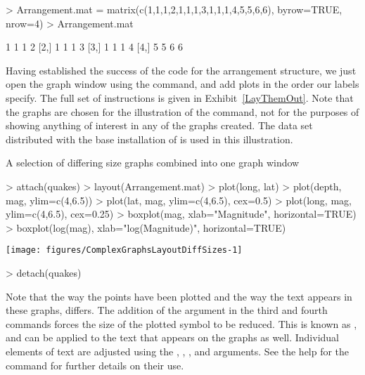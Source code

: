 \begin{Schunk}
\begin{Sinput}
> Arrangement.mat = matrix(c(1,1,1,2,1,1,1,3,1,1,1,4,5,5,6,6), byrow=TRUE, nrow=4) 
> Arrangement.mat 
\end{Sinput}
\begin{Soutput}
     [,1] [,2] [,3] [,4]
[1,]    1    1    1    2
[2,]    1    1    1    3
[3,]    1    1    1    4
[4,]    5    5    6    6
\end{Soutput}
\end{Schunk}

 
Having established the success of the code for the arrangement structure, we just open the graph window using the  command, and add plots in the order our labels specify. The full set of instructions is given in Exhibit~\ref{LayThemOut}. Note that the graphs are chosen for the illustration of the  command, not for the purposes of showing anything of interest in any of the graphs created. The  data set distributed with the base installation of \R{} is used in this illustration. 
\begin{exhibit} 
\begin{center} 
\caption{A selection of differing size graphs combined into one graph window} 
\label{LayThemOut} 

\begin{Schunk}
\begin{Sinput}
> attach(quakes) 
> layout(Arrangement.mat) 
> plot(long, lat) 
> plot(depth, mag, ylim=c(4,6.5)) 
> plot(lat, mag, ylim=c(4,6.5), cex=0.5) 
> plot(long, mag, ylim=c(4,6.5), cex=0.25) 
> boxplot(mag, xlab="Magnitude", horizontal=TRUE) 
> boxplot(log(mag), xlab="log(Magnitude)", horizontal=TRUE) 
\end{Sinput}

\texttt{[image: figures/ComplexGraphsLayoutDiffSizes-1]} \begin{Sinput}
> detach(quakes) 
\end{Sinput}
\end{Schunk}

\end{center} 
\end{exhibit} 
 
Note that the way the points have been plotted and the way the text appears in these graphs, differs. The addition of the  argument in the third and fourth  commands forces the size of the plotted symbol to be reduced. This is known as , and can be applied to the text that appears on the graphs as well. Individual elements of text are adjusted using the , , , and  arguments. See the help for the  command for further details on their use. 
 
